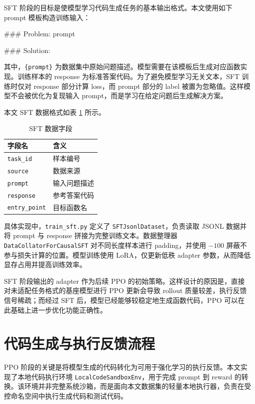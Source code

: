 SFT 阶段的目标是使模型学习代码生成任务的基本输出格式。本文使用如下 prompt 模板构造训练输入：

\begin{codeblock}[language={}]
### Problem:
{prompt}

### Solution:
\end{codeblock}

其中，\texttt{\{prompt\}} 为数据集中原始问题描述。模型需要在该模板后生成对应函数实现。训练样本的 response 为标准答案代码。为了避免模型学习无关文本，SFT 训练时仅对 response 部分计算 loss，而 prompt 部分的 label 被置为忽略值。这样模型不会被优化为复现输入 prompt，而是学习在给定问题后生成解决方案。

本文 SFT 数据格式如表 \ref{tab:sft-fields} 所示。

\begin{table}[!htp]
  \centering
  \caption{SFT 数据字段}
  \label{tab:sft-fields}
  \begin{tabular}{ll}
    \toprule
    字段名 & 含义 \\
    \midrule
    \texttt{task\_id} & 样本编号 \\
    \texttt{source} & 数据来源 \\
    \texttt{prompt} & 输入问题描述 \\
    \texttt{response} & 参考答案代码 \\
    \texttt{entry\_point} & 目标函数名 \\
    \bottomrule
  \end{tabular}
\end{table}

具体实现中，\texttt{train\_sft.py} 定义了 \texttt{SFTJsonlDataset}，负责读取 JSONL 数据并将 prompt 与 response 拼接为完整训练文本。数据整理器 \texttt{DataCollatorForCausalSFT} 对不同长度样本进行 padding，并使用 $-100$ 屏蔽不参与损失计算的位置。模型训练使用 LoRA，仅更新低秩 adapter 参数，从而降低显存占用并提高训练效率。

SFT 阶段输出的 adapter 作为后续 PPO 的初始策略。这样设计的原因是，直接对未适配任务格式的基座模型进行 PPO 更新会导致 rollout 质量较差，执行反馈信号稀疏；而经过 SFT 后，模型已经能够较稳定地生成函数代码，PPO 可以在此基础上进一步优化功能正确性。

\section{代码生成与执行反馈流程}

PPO 阶段的关键是将模型生成的代码转化为可用于强化学习的执行反馈。本文实现了本地代码执行环境 \texttt{LocalCodeSandboxEnv}，用于完成 prompt 到 reward 的转换。该环境并非完整系统沙箱，而是面向本文数据集的轻量本地执行器，负责在受控命名空间中执行生成代码和测试代码。

